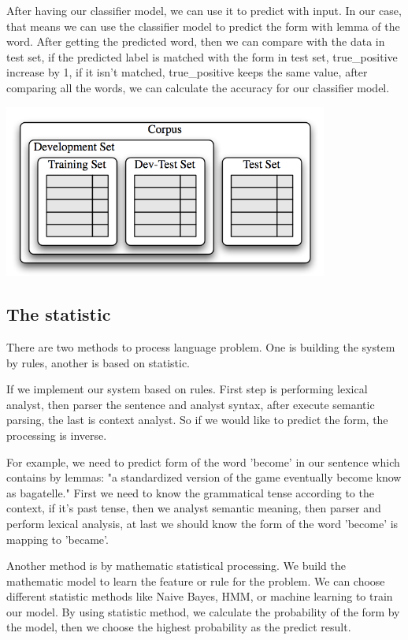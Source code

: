 \documentclass[a4paper]{article}
\begin{document}
After having our classifier model, we can use it to predict with input. In our case, that means we can use the classifier model to predict the form with lemma of the word. After getting the predicted word, then we can compare with the data in test set, if the predicted label is matched with the form in test set, true\_positive increase by 1, if it isn't matched, true\_positive keeps the same value, after comparing all the words, we can calculate the accuracy for our classifier model. 

\begin{center}
\includegraphics[width=0.8\textwidth]{Corpus.png}
\end{center}

\subsection{The statistic}

There are two methods to process language problem. One is building the system by rules, another is based on statistic.

If we implement our system based on rules. First step is performing lexical analyst, then parser the sentence and analyst syntax, after execute semantic parsing, the last is context analyst. So if we would like to predict the form, the processing is inverse. 

For example, we need to predict form of the word 'become' in our sentence which contains by lemmas: "a standardized version of the game eventually become know as bagatelle."
First we need to know the grammatical tense according to the context, if it's past tense, then we analyst semantic meaning, then parser and perform lexical analysis, at last we should know the form of the word 'become' is mapping to 'became'.

Another method is by mathematic statistical processing. We build the mathematic model to learn the feature or rule for the problem. We can choose different statistic methods like Naive Bayes, HMM, or machine learning to train our model. By using statistic method, we calculate the probability of the form by the model, then we choose the highest probability as the predict result. 
\end{document}
